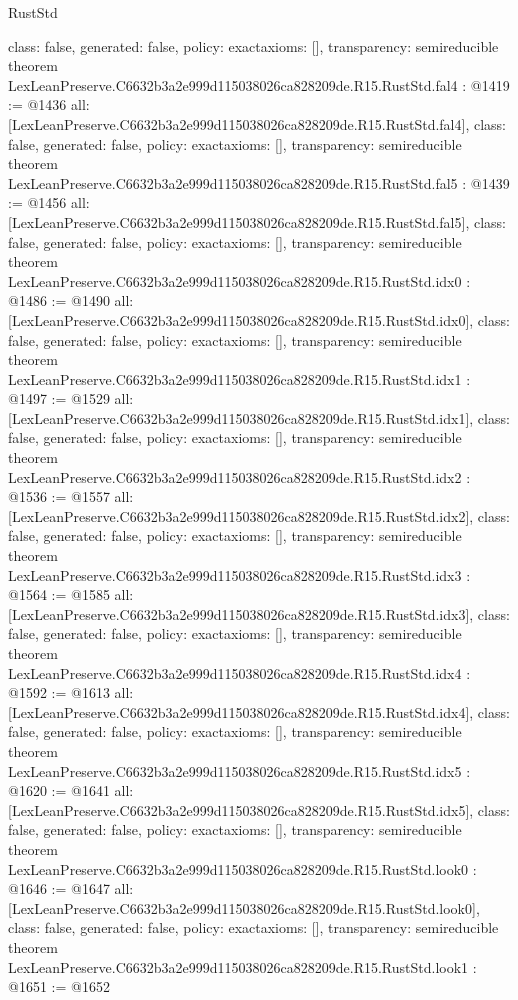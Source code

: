 \begin{lexlean}{RustStd}
\begin{coremodule}
{  class: false,
  generated: false,
  policy: exact{axioms: []},
  transparency: semireducible
}
theorem LexLeanPreserve.C6632b3a2e999d115038026ca828209de.R15.RustStd.fal4 : @1419 := @1436 {
  all: [LexLeanPreserve.C6632b3a2e999d115038026ca828209de.R15.RustStd.fal4],
  class: false,
  generated: false,
  policy: exact{axioms: []},
  transparency: semireducible
}
theorem LexLeanPreserve.C6632b3a2e999d115038026ca828209de.R15.RustStd.fal5 : @1439 := @1456 {
  all: [LexLeanPreserve.C6632b3a2e999d115038026ca828209de.R15.RustStd.fal5],
  class: false,
  generated: false,
  policy: exact{axioms: []},
  transparency: semireducible
}
theorem LexLeanPreserve.C6632b3a2e999d115038026ca828209de.R15.RustStd.idx0 : @1486 := @1490 {
  all: [LexLeanPreserve.C6632b3a2e999d115038026ca828209de.R15.RustStd.idx0],
  class: false,
  generated: false,
  policy: exact{axioms: []},
  transparency: semireducible
}
theorem LexLeanPreserve.C6632b3a2e999d115038026ca828209de.R15.RustStd.idx1 : @1497 := @1529 {
  all: [LexLeanPreserve.C6632b3a2e999d115038026ca828209de.R15.RustStd.idx1],
  class: false,
  generated: false,
  policy: exact{axioms: []},
  transparency: semireducible
}
theorem LexLeanPreserve.C6632b3a2e999d115038026ca828209de.R15.RustStd.idx2 : @1536 := @1557 {
  all: [LexLeanPreserve.C6632b3a2e999d115038026ca828209de.R15.RustStd.idx2],
  class: false,
  generated: false,
  policy: exact{axioms: []},
  transparency: semireducible
}
theorem LexLeanPreserve.C6632b3a2e999d115038026ca828209de.R15.RustStd.idx3 : @1564 := @1585 {
  all: [LexLeanPreserve.C6632b3a2e999d115038026ca828209de.R15.RustStd.idx3],
  class: false,
  generated: false,
  policy: exact{axioms: []},
  transparency: semireducible
}
theorem LexLeanPreserve.C6632b3a2e999d115038026ca828209de.R15.RustStd.idx4 : @1592 := @1613 {
  all: [LexLeanPreserve.C6632b3a2e999d115038026ca828209de.R15.RustStd.idx4],
  class: false,
  generated: false,
  policy: exact{axioms: []},
  transparency: semireducible
}
theorem LexLeanPreserve.C6632b3a2e999d115038026ca828209de.R15.RustStd.idx5 : @1620 := @1641 {
  all: [LexLeanPreserve.C6632b3a2e999d115038026ca828209de.R15.RustStd.idx5],
  class: false,
  generated: false,
  policy: exact{axioms: []},
  transparency: semireducible
}
theorem LexLeanPreserve.C6632b3a2e999d115038026ca828209de.R15.RustStd.look0 : @1646 := @1647 {
  all: [LexLeanPreserve.C6632b3a2e999d115038026ca828209de.R15.RustStd.look0],
  class: false,
  generated: false,
  policy: exact{axioms: []},
  transparency: semireducible
}
theorem LexLeanPreserve.C6632b3a2e999d115038026ca828209de.R15.RustStd.look1 : @1651 := @1652 {
}
\end{coremodule}
\end{lexlean}

